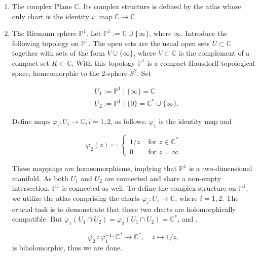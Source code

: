 \begin{example} \hspace{0.5cm}
\begin{enumerate}
    \item The complex Plane $\mathbb{C}$. Its complex structure is defined by the atlas whose only chart is the identity $i: \operatorname{map} \mathbb{C} \rightarrow \mathbb{C}$.
    \item The Riemann sphere $\mathbb{P}^{1}$. Let $\mathbb{P}^{1}:=\mathbb{C} \cup\{\infty\}$, where $\infty$. Introduce the following topology on $\mathbb{P}^{1}$. The open sets are the usual open sets $U \subset \mathbb{C}$ together with sets of the form $V \cup\{\infty\}$, where $V \subset \mathbb{C}$ is the complement of a compact set $K \subset \mathbb{C}$. With this topology $\mathbb{P}^{1}$ is a compact Hausdorff topological space, homeomorphic to the 2-sphere $S^{2}$. Set

$$
\begin{aligned}
& U_{1}:=\mathbb{P}^{1} \mid\{\infty\}=\mathbb{C} \\
& U_{2}:=\mathbb{P}^{1} \mid\{0\}=\mathbb{C}^{*} \cup\{\infty\} .
\end{aligned}
$$

Define maps $\varphi_{i}: U_{i} \rightarrow \mathbb{C}, i=1,2$, as follows. $\varphi_{1}$ is the identity map and

$$
\varphi_{2}(z):=\left\{\begin{array}{cl}
1 / z & \text { for } z \in \mathbb{C}^{*} \\
0 & \text { for } z=\infty
\end{array}\right.
$$
 
These mappings are homeomorphisms, implying that $\mathbb{P}^{1}$ is a two-dimensional manifold. As both $U_{1}$ and $U_{2}$ are connected and share a non-empty intersection, $\mathbb{P}^{1}$ is connected as well. To define the complex structure on $\mathbb{P}^{1}$, we utilize the atlas comprising the charts $\varphi_{i}: U_{i} \rightarrow \mathbb{C}$, where $i=1,2$. The crucial task is to demonstrate that these two charts are holomorphically compatible.
But $\varphi_{1}\left(U_{1} \cap U_{2}\right)=\varphi_{2}\left(U_{1} \cap U_{2}\right)=\mathbb{C}^{*}$, and , 

$$
\varphi_{2} \circ \varphi_{1}^{-1}: \mathbb{C}^{*} \rightarrow \mathbb{C}^{*}, \quad z \mapsto 1 / z,$$
is biholomorphic, thus we are done.


\end{enumerate}
\end{example}
